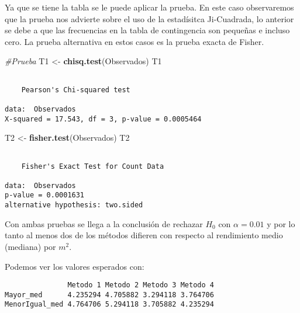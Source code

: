 \documentclass[a4paper,oneside,openany]{book}
\newenvironment{Shaded}{\begin{snugshade}}{\end{snugshade}}
\newcommand{\KeywordTok}[1]{\textcolor[rgb]{0.13,0.29,0.53}{\textbf{#1}}}
\newcommand{\StringTok}[1]{\textcolor[rgb]{0.31,0.60,0.02}{#1}}
\newcommand{\CommentTok}[1]{\textcolor[rgb]{0.56,0.35,0.01}{\textit{#1}}}
\newcommand{\OperatorTok}[1]{\textcolor[rgb]{0.81,0.36,0.00}{\textbf{#1}}}
\newcommand{\NormalTok}[1]{#1}
\begin{document}
Ya que se tiene la tabla se le puede aplicar la prueba. En este caso
observaremos que la prueba nos advierte sobre el uso de la estadísitca
Ji-Cuadrada, lo anterior se debe a que las frecuencias en la tabla de
contingencia son pequeñas e incluso cero. La prueba alternativa en estos
casos es la prueba exacta de Fisher.

\begin{Shaded}
\begin{Highlighting}[]
\CommentTok{#Prueba}
\NormalTok{T1 <-}\StringTok{ }\KeywordTok{chisq.test}\NormalTok{(Observados)}
\NormalTok{T1}
\end{Highlighting}
\end{Shaded}

\begin{verbatim}

    Pearson's Chi-squared test

data:  Observados
X-squared = 17.543, df = 3, p-value = 0.0005464
\end{verbatim}

\begin{Shaded}
\begin{Highlighting}[]
\NormalTok{T2 <-}\StringTok{ }\KeywordTok{fisher.test}\NormalTok{(Observados)}
\NormalTok{T2}
\end{Highlighting}
\end{Shaded}

\begin{verbatim}

    Fisher's Exact Test for Count Data

data:  Observados
p-value = 0.0001631
alternative hypothesis: two.sided
\end{verbatim}

Con ambas pruebas se llega a la conclusión de rechazar \(H_0\) con
\(\alpha=0.01\) y por lo tanto al menos dos de los métodos difieren con
respecto al rendimiento medio (mediana) por \(m^2\).

Podemos ver los valores esperados con:

\begin{Shaded}
\end{Shaded}

\begin{verbatim}
               Metodo 1 Metodo 2 Metodo 3 Metodo 4
Mayor_med      4.235294 4.705882 3.294118 3.764706
MenorIgual_med 4.764706 5.294118 3.705882 4.235294
\end{verbatim}
\end{document}
